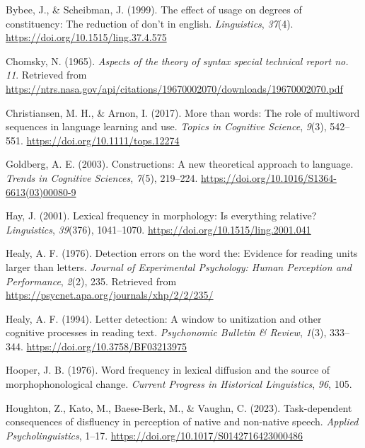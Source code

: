 \documentclass[
  man,floatsintext]{apa6}
\newlength{\cslhangindent}
\newenvironment{CSLReferences}[2] %
 {\begin{list}{}{%
  \setlength{\itemindent}{0pt}
  \setlength{\leftmargin}{0pt}
  \setlength{\parsep}{0pt}
  \ifodd #1
   \setlength{\leftmargin}{\cslhangindent}
   \setlength{\itemindent}{-1\cslhangindent}
  \fi
  \setlength{\itemsep}{#2\baselineskip}}}
 {\end{list}}
\begin{document}
\begin{CSLReferences}{1}{0}
Bybee, J., \& Scheibman, J. (1999). The effect of usage on degrees of constituency: The reduction of don't in english. \emph{Linguistics}, \emph{37}(4). \url{https://doi.org/10.1515/ling.37.4.575}

Chomsky, N. (1965). \emph{Aspects of the theory of syntax special technical report no. 11}. Retrieved from \url{https://ntrs.nasa.gov/api/citations/19670002070/downloads/19670002070.pdf}

Christiansen, M. H., \& Arnon, I. (2017). More than words: The role of multiword sequences in language learning and use. \emph{Topics in Cognitive Science}, \emph{9}(3), 542--551. \url{https://doi.org/10.1111/tops.12274}

Goldberg, A. E. (2003). Constructions: A new theoretical approach to language. \emph{Trends in Cognitive Sciences}, \emph{7}(5), 219--224. \url{https://doi.org/10.1016/S1364-6613(03)00080-9}

Hay, J. (2001). Lexical frequency in morphology: Is everything relative? \emph{Linguistics}, \emph{39}(376), 1041--1070. \url{https://doi.org/10.1515/ling.2001.041}

Healy, A. F. (1976). Detection errors on the word the: Evidence for reading units larger than letters. \emph{Journal of Experimental Psychology: Human Perception and Performance}, \emph{2}(2), 235. Retrieved from \url{https://psycnet.apa.org/journals/xhp/2/2/235/}

Healy, A. F. (1994). Letter detection: A window to unitization and other cognitive processes in reading text. \emph{Psychonomic Bulletin \& Review}, \emph{1}(3), 333--344. \url{https://doi.org/10.3758/BF03213975}

Hooper, J. B. (1976). Word frequency in lexical diffusion and the source of morphophonological change. \emph{Current Progress in Historical Linguistics}, \emph{96}, 105.

Houghton, Z., Kato, M., Baese-Berk, M., \& Vaughn, C. (2023). Task-dependent consequences of disfluency in perception of native and non-native speech. \emph{Applied Psycholinguistics}, 1--17. \url{https://doi.org/10.1017/S0142716423000486}


\end{CSLReferences}
\end{document}
